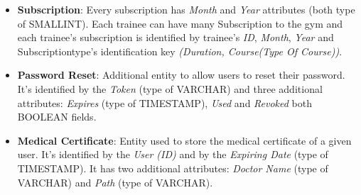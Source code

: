 \begin{itemize}
    	\item \textbf{Subscription}: Every subscription has \textit{Month} and \textit{Year} attributes (both type of SMALLINT). Each trainee can have many Subscription to the gym and each trainee's subscription is identified by trainee's \textit{ID}, \textit{Month}, \textit{Year} and Subscription\textunderscore type's identification key \textit{(Duration, Course(Type Of Course))}.
    	
    	\item \textbf{Password Reset}: Additional entity to allow users to reset their password. It's identified by the \textit{Token} (type of VARCHAR) and three additional attributes: \textit{Expires} (type of TIMESTAMP), \textit{Used} and \textit{Revoked} both BOOLEAN fields.
        
        \item \textbf{Medical Certificate}: Entity used to store the medical certificate of a given user. It's identified by the \textit{User (ID)} and by the \textit{Expiring Date} (type of TIMESTAMP). It has two additional attributes: \textit{Doctor Name} (type of VARCHAR) and \textit{Path} (type of VARCHAR).
	
    \end{itemize}